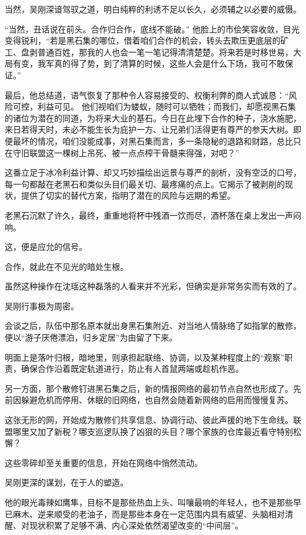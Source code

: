 当然，吴刚深谙驾驭之道，明白纯粹的利诱不足以长久，必须辅之以必要的威慑。

“当然，丑话说在前头。合作归合作，底线不能破。” 他脸上的市侩笑容收敛，目光变得锐利，“若是黑石集的哪位，借着咱们合作的机会，转头去欺压更底层的矿工、盘剥普通百姓，那我的人也会一笔一笔记得清清楚楚。将来若是时移世易，大局有变，我军真的得了势，到了清算的时候，这些人会是什么下场，我可不敢保证。”

最后，他总结道，语气恢复了那种令人容易接受的、权衡利弊的商人式诚恳：“风险可控，利益可见。 他们视咱们为蝼蚁，随时可以牺牲；而我们，却愿视黑石集的诸位为潜在的同道，为将来大业的基石。今日在此埋下合作的种子，浇水施肥，来日若得天时，未必不能生长为庇护一方、让兄弟们活得更有尊严的参天大树。即便最坏的情况，咱们没能成事，对黑石集而言，多一条隐秘的退路和财路，总比只在守旧联盟这一棵树上吊死、被一点点榨干骨髓来得强，对吧？”

这番立足于冰冷利益计算、却又巧妙描绘出远景与尊严的剖析，没有空泛的口号，每一句都敲在老黑石和类似头目们最关切、最疼痛的点上。它揭示了被剥削的现状，提供了切实的替代方案，指明了潜在的风险与远期的希望。

老黑石沉默了许久，最终，重重地将杯中残酒一饮而尽，酒杯落在桌上发出一声闷响。

这，便是应允的信号。

合作，就此在不见光的暗处生根。

虽然这种操作在沈瑶这种磊落的人看来并不光彩，但确实是非常务实而有效的了。

吴刚行事极为周密。

会谈之后，队伍中那名原本就出身黑石集附近、对当地人情脉络了如指掌的散修，便以“游子厌倦漂泊，归乡定居”为由留了下来。

明面上是落叶归根，暗地里，则承担起联络、协调，以及某种程度上的“观察”职责，确保合作沿着既定轨道进行，防止有人首鼠两端或趁机作恶。

另一方面，那个散修钉进黑石集之后，新的情报网络的最初节点自然也形成了。先前因躲避危机而停用、休眠的旧网络，也自然会随着新网络的启用而慢慢复苏。

这张无形的网，开始成为散修们共享信息、协调行动、彼此声援的地下生命线。联盟哪里又加了新税？哪支巡逻队换了凶狠的头目？哪个家族的仓库最近看守特别松懈？

这些零碎却至关重要的信息，开始在网络中悄然流动。

\vspace{2em}

吴刚更深的谋划，在于人的塑造。

他的眼光毒辣如鹰隼，目标不是那些热血上头、叫嚷最响的年轻人，也不是那些早已麻木、逆来顺受的老油子，而是那些本身在一定范围内具有威望、头脑相对清醒、对现状积累了足够不满、内心深处依然渴望改变的“中间层”。


